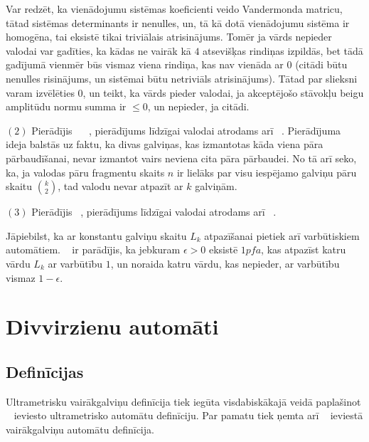 \documentclass{ludis}
\begin{document}
\begin{pieradijums}
Var redzēt, ka vienādojumu sistēmas koeficienti veido Vandermonda matricu, tātad sistēmas determinants ir nenulles, un, tā kā dotā vienādojumu sistēma ir homogēna, tai eksistē tikai triviālais atrisinājums. Tomēr ja vārds nepieder valodai var gadīties, ka kādas ne vairāk kā $4$ atsevišķas rindiņas izpildās, bet tādā gadījumā vienmēr būs vismaz viena rindiņa, kas nav vienāda ar 0 (citādi būtu nenulles risinājums, un sistēmai būtu netriviāls atrisinājums). Tātad par slieksni varam izvēlēties 0, un teikt, ka vārds pieder valodai, ja akceptējošo stāvokļu beigu amplitūdu normu summa ir $\leq 0$, un nepieder, ja citādi.

$(2)$ Pierādījis ~\citet{Freivalds1982} ~\citep{Freivalds1979}, pierādījums līdzīgai valodai atrodams arī ~\citep{Yao1978}. Pierādījuma ideja balstās uz faktu, ka divas galviņas, kas izmantotas kāda viena pāra pārbaudīšanai, nevar izmantot vairs neviena cita pāra pārbaudei. No tā arī seko, ka, ja valodas pāru fragmentu skaits $n$ ir lielāks par visu iespējamo galviņu pāru skaitu ${k\choose 2}$, tad valodu nevar atpazīt ar $k$ galviņām.

$(3)$ Pierādījis ~\citet{Freivalds1982}, pierādījums līdzīgai valodai atrodams arī ~\citep{Yao1978}.
\end{pieradijums}

Jāpiebilst, ka ar konstantu galviņu skaitu $L_k$ atpazīšanai pietiek arī varbūtiskiem automātiem. ~\citet{Freivalds1982} ir parādījis, ka jebkuram $\epsilon > 0$ eksistē $1pfa$, kas atpazīst katru vārdu $L_k$ ar varbūtību $1$, un noraida katru vārdu, kas nepieder, ar varbūtību vismaz $1 - \epsilon$.

\chapter{Divvirzienu automāti}
\section{Definīcijas}
Ultrametrisku vairākgalviņu definīcija tiek iegūta visdabiskākajā veidā paplašinot ~\citep{KasparsBalodis2013} ieviesto ultrametrisko automātu definīciju. Par pamatu tiek ņemta arī ~\citep{Holzer2009} ieviestā vairākgalviņu automātu definīcija.
\end{document}
